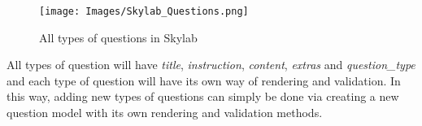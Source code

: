 \begin{figure}[h]
    \centering
    \texttt{[image: Images/Skylab\_Questions.png]}
    \caption{All types of questions in Skylab}
    \label{fig:SkylabQuestions}
\end{figure}

All types of question will have \textit{title}, \textit{instruction}, \textit{content}, \textit{extras} and \textit{question\_type} and each type of question will have its own way of rendering and validation. In this way, adding new types of questions can simply be done via creating a new question model with its own rendering and validation methods.
